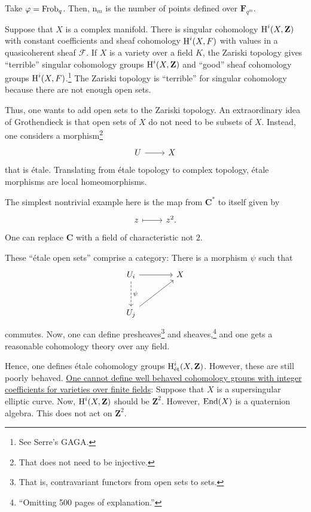\documentclass [11 pt, oneside] {article}
\begin{document}
Take $\varphi = \operatorname{Frob}_{q}$. Then, $\mathup{n}_m$ is the number of points defined over $\mathbf{F}_{q^{m}}$.

Suppose that $X$ is a complex manifold. There is singular cohomology $\operatorname{H}^{i}(X, \mathbf{Z})$ with constant coefficients and sheaf cohomology $\operatorname{H}^{i}(X,\relax{F})$ with values in a quasicoherent sheaf $\mathscr{F}$.
If $X$ is a variety over a field $K$, the Zariski topology gives ``terrible'' singular cohomology groups $\operatorname{H}^{i}(X,\mathbf{Z})$ and ``good'' sheaf cohomology groups $\operatorname{H}^{i}(X, \relax{F})$.\footnote{See Serre's GAGA.} 
The Zariski topology is ``terrible'' for singular cohomology because there are not enough open sets.

Thus, one wants to add open sets to the Zariski topology. An extraordinary idea of Grothendieck is that open sets of $X$ do not need to be subsets of $X$.
Instead, one considers a morphism\footnote{That does not need to be injective.}
\[
\begin{tikzcd}
	U\ar[r]& X
\end{tikzcd}
\]
that is \'etale. Translating from \'etale topology to complex topology, \'etale morphisms are local homeomorphisms.

The simplest nontrivial example here is the map from $\mathbf{C}^{*}$ to itself given by
\[
\begin{tikzcd}
	z\ar[r,mapsto]&z^{2}.
\end{tikzcd}
\]
One can replace $\mathbf{C}$ with a field of characteristic not $2$.

These ``\'etale open sets'' comprise a category: There is a morphism $\psi$ such that
\[
\begin{tikzcd}[column sep = 4 em, row sep = 3 em]
	U_{i}\ar[r]\ar[d,dashed,"\psi"] & X\\
	U_{j}\ar[ur]
\end{tikzcd}
\]
commutes.
Now, one can define presheaves\footnote{That is, contravariant functors from open sets to sets.} and sheaves,\footnote{``Omitting 500 pages of explanation.''} and one gets a reasonable cohomology theory over any field.

Hence, one defines \'etale cohomology groups $\operatorname{H}_{\textup {\'et}}^{i}(X,\mathbf{Z})$. However, these are still poorly behaved. \ul{One cannot define well behaved cohomology groups with integer coefficients for varieties over finite fields}: Suppose that $X$ is a supersingular elliptic curve. Now, $\operatorname{H}^{i}(X,\mathbf{Z})$ should be $\mathbf{Z}^{2}$. 
However, $\operatorname{End}(X)$ is a quaternion algebra. This does not act on $\mathbf{Z}^{2}$.
\end{document}
